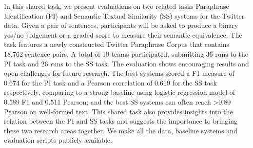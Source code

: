 In this shared task, we present evaluations on two related tasks Paraphrase Identification (PI) and Semantic Textual Similarity (SS) systems for the Twitter data. Given a pair of sentences, participants will be asked to produce a binary yes/no judgement or a graded score to measure their semantic equivalence. The task features a newly constructed Twitter Paraphrase Corpus that contains 18,762 sentence pairs.  A total of 19 teams participated, submitting 36 runs to the PI task and 26 runs to the SS task. The evaluation shows encouraging results and open challenges for future research. The best systems scored a F1-measure of 0.674 for the PI task and a Pearson correlation of 0.619 for the SS task respectively, comparing to a strong baseline using logistic regression model of 0.589 F1 and 0.511 Pearson; and the best SS systems can often reach >0.80 Pearson on well-formed text. This shared task also provides insights into the relation between the PI and SS tasks and suggests the importance to bringing these two research areas together. We make all the data, baseline systems and evaluation scripts publicly available.
